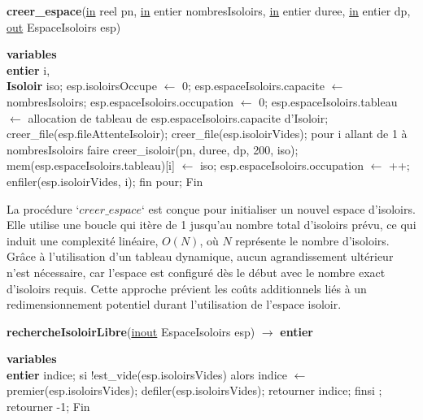 \documentclass[12pt]{article} %
\begin{document}
\begin{algorithm}
	\caption{\textbf{creer\_espace}(\underline{in} reel pn, \underline{in} entier nombresIsoloirs, \underline{in} entier duree, \underline{in} entier dp, \underline{out} EspaceIsoloirs esp)}
	\begin{algorithmic}[1]
		\State \textbf{variables}\\ \textbf{entier} i,\\ \textbf{Isoloir} iso;
		\Start
		\State esp.isoloirsOccupe $\leftarrow$ 0;
		\State esp.espaceIsoloirs.capacite $\leftarrow$ nombresIsoloirs;
		\State esp.espaceIsoloirs.occupation $\leftarrow$ 0;
		\State esp.espaceIsoloirs.tableau $\leftarrow$ allocation de tableau de esp.espaceIsoloirs.capacite d'Isoloir;  
		\State creer\_file(esp.fileAttenteIsoloir);
		\State creer\_file(esp.isoloirVides);  
		\State pour i allant de 1 à nombresIsoloirs faire 
		\State \hspace{\algorithmicindent}  creer\_isoloir(pn, duree, dp, 200, iso);
		\State \hspace{\algorithmicindent} mem(esp.espaceIsoloirs.tableau)[i] $\leftarrow$ iso;
		\State  \hspace{\algorithmicindent} esp.espaceIsoloirs.occupation $\leftarrow$ ++;
		\State  \hspace{\algorithmicindent} enfiler(esp.isoloirVides, i);
		\State  fin pour;
		\State Fin
		
	\end{algorithmic}
\end{algorithm}

La procédure `$creer\_espace$` est conçue pour initialiser un nouvel espace d'isoloirs. Elle utilise une boucle qui itère de 1 jusqu'au nombre total d'isoloirs prévu, ce qui induit une complexité linéaire, \( O(N) \), où \( N \) représente le nombre d'isoloirs. Grâce à l'utilisation d'un tableau dynamique, aucun agrandissement ultérieur n'est nécessaire, car l'espace est configuré dès le début avec le nombre exact d'isoloirs requis. Cette approche prévient les coûts additionnels liés à un redimensionnement potentiel durant l'utilisation de l'espace isoloir.

\begin{algorithm}
	\caption{\textbf{rechercheIsoloirLibre}(\underline{inout} EspaceIsoloirs esp) $\rightarrow$ \textbf{entier}}
	\begin{algorithmic}[1]
		\State \textbf{variables}\\ \textbf{entier} indice;
		\Start
		\State si !est\_vide(esp.isoloirsVides) alors
		\State  \hspace{\algorithmicindent} indice $\leftarrow$ premier(esp.isoloirsVides); 
		\State  \hspace{\algorithmicindent} defiler(esp.isoloirsVides);
		\State  \hspace{\algorithmicindent} retourner indice;
		\State finsi ;
		\State retourner -1;
		\State Fin
	\end{algorithmic}
\end{algorithm}
\newpage
\end{document}
